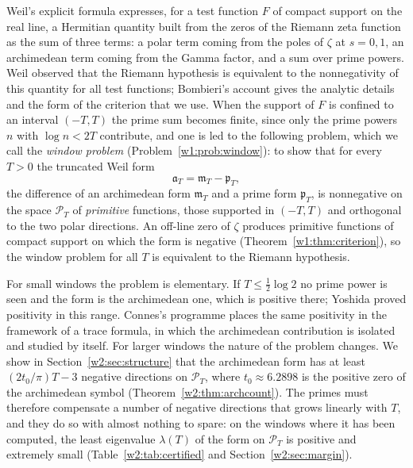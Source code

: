\documentclass[11pt]{amsart}
\theoremstyle{definition}
\theoremstyle{remark}
\numberwithin{equation}{section}
\newcommand{\PT}{\mathcal{P}_T}                        %
\newcommand{\mT}{\mathfrak{m}_T}                       %
\newcommand{\pT}{\mathfrak{p}_T}                       %
\newcommand{\aT}{\mathfrak{a}_T}                       %
\newcommand{\lam}{\lambda(T)}                          %
\begin{document}
Weil's explicit formula \cite{Weil52} expresses, for a test function $F$ of compact support on the real line, a
Hermitian quantity built from the zeros of the Riemann zeta function as the sum of three terms: a polar term
coming from the poles of $\zeta$ at $s=0,1$, an archimedean term coming from the Gamma factor, and a sum over
prime powers. Weil observed that the Riemann hypothesis is equivalent to the nonnegativity of this quantity for
all test functions; Bombieri's account \cite{Bombieri2000} gives the analytic details and the form of the
criterion that we use. When the support of $F$ is confined to an interval $(-T,T)$ the prime sum becomes finite,
since only the prime powers $n$ with $\log n<2T$ contribute, and one is led to the following problem, which we
call the \emph{window problem} (Problem~\ref{w1:prob:window}): to show that for every $T>0$ the truncated Weil
form
\[
\aT=\mT-\pT ,
\]
the difference of an archimedean form $\mT$ and a prime form $\pT$, is nonnegative on the space $\PT$ of
\emph{primitive} functions, those supported in $(-T,T)$ and orthogonal to the two polar directions. An off-line
zero of $\zeta$ produces primitive functions of compact support on which the form is negative
(Theorem~\ref{w1:thm:criterion}), so the window problem for all $T$ is equivalent to the Riemann hypothesis.

For small windows the problem is elementary. If $T\le\frac12\log2$ no prime power is seen and the form is the
archimedean one, which is positive there; Yoshida \cite{Yoshida1992} proved positivity in this range. Connes's
programme \cite{Connes1999,ConnesConsani2021} places the same positivity in the framework of a trace formula, in
which the archimedean contribution is isolated and studied by itself. For larger windows the nature of the
problem changes. We show in Section~\ref{w2:sec:structure} that the archimedean form has at least
$(2t_0/\pi)T-3$ negative directions on $\PT$, where $t_0\approx6.2898$ is the positive zero of the archimedean
symbol (Theorem~\ref{w2:thm:archcount}). The primes must therefore compensate a number of negative directions
that grows linearly with $T$, and they do so with almost nothing to spare: on the windows where it has been
computed, the least eigenvalue $\lam$ of the form on $\PT$ is positive and extremely small
(Table~\ref{w2:tab:certified} and Section~\ref{w2:sec:margin}).
\end{document}
